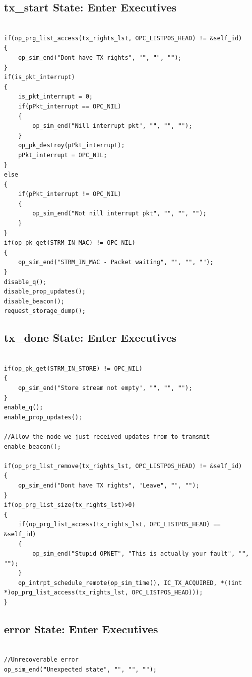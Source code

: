 \subsection{tx_start State: Enter Executives}
{\tiny
\begin{verbatim}

if(op_prg_list_access(tx_rights_lst, OPC_LISTPOS_HEAD) != &self_id)
{
	op_sim_end("Dont have TX rights", "", "", "");	
}
if(is_pkt_interrupt)
{
	is_pkt_interrupt = 0;
	if(pPkt_interrupt == OPC_NIL)
	{
		op_sim_end("Nill interrupt pkt", "", "", "");	
	}
	op_pk_destroy(pPkt_interrupt);
	pPkt_interrupt = OPC_NIL;
}
else
{
	if(pPkt_interrupt != OPC_NIL)
	{
		op_sim_end("Not nill interrupt pkt", "", "", "");	
	}
}
if(op_pk_get(STRM_IN_MAC) != OPC_NIL)
{
	op_sim_end("STRM_IN_MAC - Packet waiting", "", "", "");	
}
disable_q();
disable_prop_updates();
disable_beacon();
request_storage_dump();

\end{verbatim}
}

\subsection{tx_done State: Enter Executives}
{\tiny
\begin{verbatim}

if(op_pk_get(STRM_IN_STORE) != OPC_NIL)
{
	op_sim_end("Store stream not empty", "", "", "");
}
enable_q();
enable_prop_updates();

//Allow the node we just received updates from to transmit
enable_beacon();

if(op_prg_list_remove(tx_rights_lst, OPC_LISTPOS_HEAD) != &self_id)
{
	op_sim_end("Dont have TX rights", "Leave", "", "");	
}
if(op_prg_list_size(tx_rights_lst)>0)
{
	if(op_prg_list_access(tx_rights_lst, OPC_LISTPOS_HEAD) == &self_id)
	{
		op_sim_end("Stupid OPNET", "This is actually your fault", "", "");	
	}
	op_intrpt_schedule_remote(op_sim_time(), IC_TX_ACQUIRED, *((int *)op_prg_list_access(tx_rights_lst, OPC_LISTPOS_HEAD)));
}

\end{verbatim}
}

\subsection{error State: Enter Executives}
{\tiny
\begin{verbatim}

//Unrecoverable error
op_sim_end("Unexpected state", "", "", "");

\end{verbatim}
}

